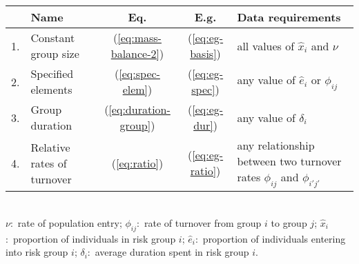 \begin{tabular}{clccl}
	\toprule
	   & Name                       &            Eq.            &        E.g.         & Data requirements                                                         \\
	\midrule
	1. & Constant group size        & (\ref{eq:mass-balance-2}) & (\ref{eq:eg-basis}) & all values of $\hat{x}_i$ and $\nu$                                       \\
	2. & Specified elements         &   (\ref{eq:spec-elem})    & (\ref{eq:eg-spec})  & any value of $\hat{e}_i$ or $\phi_{ij}$                                   \\
	3. & Group duration             & (\ref{eq:duration-group}) &  (\ref{eq:eg-dur})  & any value of $\delta_i$                                                   \\
	4. & Relative rates of turnover &     (\ref{eq:ratio})      & (\ref{eq:eg-ratio}) & any relationship between two turnover rates $\phi_{ij}$ and $\phi_{i'j'}$ \\
	\bottomrule
\end{tabular}\\[1em]
\footnotesize\flushleft
$\nu$:~rate of population entry;
$\phi_{ij}$:~rate of turnover from group $i$ to group $j$;
$\hat{x}_i$:~proportion of individuals in risk group $i$;
$\hat{e}_i$:~proportion of individuals entering into risk group $i$;
$\delta_i$:~average duration spent in risk group $i$.